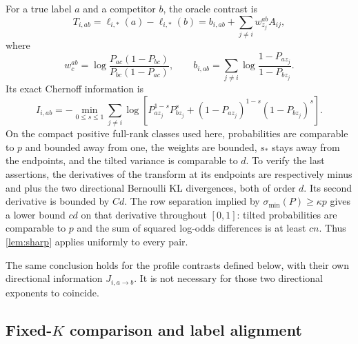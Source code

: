 For a true label $a$ and a competitor $b$, the oracle contrast is
\[
 T_{i,ab}=\ell_{i,*}(a)-\ell_{i,*}(b)
 =b_{i,ab}+\sum_{j\ne i}w^{ab}_{z_j}A_{ij},
\]
where
\begin{equation}\label{eq:sbm-weights}
 w_c^{ab}=\log\frac{P_{ac}(1-P_{bc})}{P_{bc}(1-P_{ac})},\qquad
 b_{i,ab}=\sum_{j\ne i}\log\frac{1-P_{az_j}}{1-P_{bz_j}}.
\end{equation}
Its exact Chernoff information is
\begin{equation}\label{eq:sbm-information}
 I_{i,ab}= -\min_{0\le s\le1}
 \sum_{j\ne i}\log\left[
 P_{az_j}^{1-s}P_{bz_j}^{s}
 +(1-P_{az_j})^{1-s}(1-P_{bz_j})^{s}\right].
\end{equation}
On the compact positive full-rank classes used here, probabilities are
comparable to $p$ and bounded away from one, the weights are bounded,
$s_*$ stays away from the endpoints, and the tilted variance is comparable
to $d$. To verify the last assertions, the derivatives of the transform
at its endpoints are respectively minus and plus the two directional
Bernoulli KL divergences, both of order $d$. Its second derivative is
bounded by $Cd$. The row separation implied by
$\sigma_{\min}(P)\ge\kappa p$ gives a lower bound $cd$ on that derivative
throughout $[0,1]$: tilted probabilities are comparable to $p$ and the
sum of squared log-odds differences is at least $cn$.
Thus \cref{lem:sharp} applies uniformly to every pair.

The same conclusion holds for the profile contrasts defined below, with
their own directional information $J_{i,a\to b}$.
It is not necessary for those two directional exponents to coincide.

\subsection{Fixed-\texorpdfstring{$K$}{K} comparison and label alignment}

